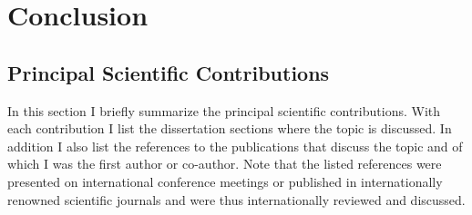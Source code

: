 \graphicspath{{img/}}





\chapter{Conclusion}
\label{chap:conclusion}


\section{Principal Scientific Contributions}
In this section I briefly summarize the principal scientific contributions. With each contribution I list the dissertation sections where the topic is discussed. In addition I also list the references to the publications that discuss the topic and of which I was the first author or co-author. Note that the listed references were presented on international conference meetings or published in internationally renowned scientific journals and were thus internationally reviewed and discussed.
